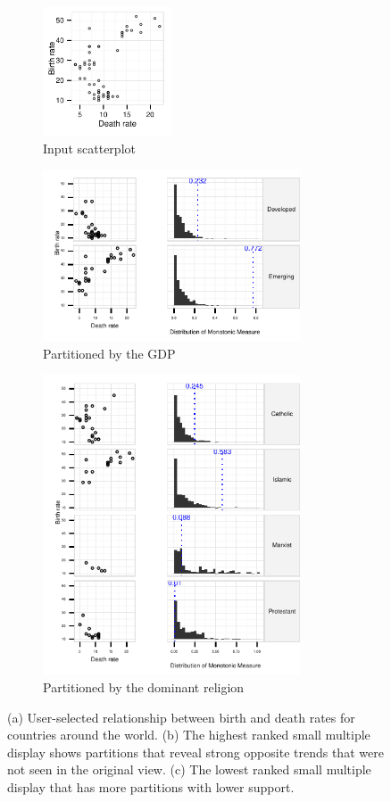 \begin{figure}[t]
 \centering 
	 \begin{subfigure}{1.5in}
		\includegraphics[width=1.5in]{images/DEATH_RT-BIRTH_RT.pdf}
		  \caption{Input scatterplot}
		 \label{fig:informative_all}
	\end{subfigure}
	\begin{subfigure}{3in}
		\includegraphics[width=3in]{images/9_95670214716782-GDP.pdf}
		  \caption{Partitioned by the GDP}
		 \label{fig:informative}
	 \end{subfigure}
	 \begin{subfigure}{3in}
		\includegraphics[width=3in]{images/3_80130820585327-LEADER.pdf}
		  \caption{Partitioned by the dominant religion}
		 \label{fig:not_informative}
	 \end{subfigure}
	  \caption{(a) User-selected relationship between birth and death rates for countries around the world. (b) The highest ranked small multiple display shows partitions that reveal strong opposite trends that were not seen in the original view. (c) The lowest ranked small multiple display that has more partitions with lower support.}
\end{figure}

